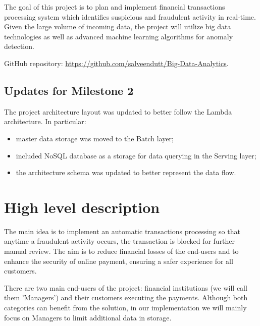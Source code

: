 \documentclass[12pt,a4paper, hidelinks]{article}
\begin{document}
The goal of this project is to plan and implement financial transactions processing system which identifies suspicious and fraudulent activity in real-time. Given the large volume of incoming data, the project will utilize big data technologies as well as advanced machine learning algorithms for anomaly detection.

GitHub repository: \href{https://github.com/salveendutt/Big-Data-Analytics}{https://github.com/salveendutt/Big-Data-Analytics}.

\subsection*{Updates for Milestone 2}
The project architecture layout was updated to better follow the Lambda architecture. In particular: 
\begin{itemize}
    \item master data storage was moved to the Batch layer;
    \item included NoSQL database as a storage for data querying in the Serving layer;
    \item the architecture schema was updated to better represent the data flow. 
\end{itemize}

\newpage

\section{High level description}

The main idea is to implement an automatic transactions processing so that anytime a fraudulent activity occurs, the transaction is blocked for further manual review. The aim is to reduce financial losses of the end-users and to enhance the security of online payment, ensuring a safer experience for all customers.

There are two main end-users of the project: financial institutions (we will call them 'Managers') and their customers executing the payments. Although both categories can benefit from the solution, in our implementation we will mainly focus on Managers to limit additional data in storage.
\end{document}

